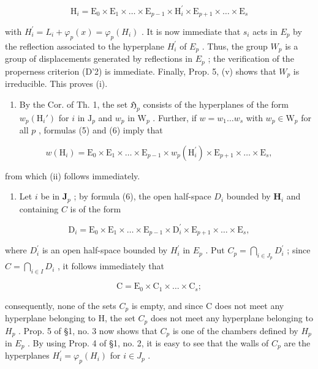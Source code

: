 \[
\mathrm{H} _ {i} = \mathrm{E} _ {0} \times \mathrm{E} _ {1} \times \dots \times \mathrm{E} _ {p - 1} \times \mathrm{H} _ {i} ^ {\prime} \times \mathrm{E} _ {p + 1} \times \dots \times \mathrm{E} _ {s}\tag{6}
\]

with \(H_{i}^{\prime}=L_{i}+\varphi_{p}(x)=\varphi_{p}(H_{i})\) . It is now immediate that \(s_{i}\) acts in \(E_{p}\) by the reflection associated to the hyperplane \(H_{i}^{\prime}\) of \(E_{p}\) . Thus, the group \(W_{p}\) is a group of displacements generated by reflections in \(E_{p}\) ; the verification of the properness criterion (D'2) is immediate. Finally, Prop. 5, (v) shows that \(W_{p}\) is irreducible. This proves (i).

\begin{enumerate}
\def\labelenumi{(\roman{enumi})}
\setcounter{enumi}{1}
\tightlist
\item
  By the Cor. of Th. 1, the set \(\mathfrak{H}_p\) consists of the hyperplanes of the form \(w_p(\mathrm{H}_i')\) for \(i\) in \(\mathrm{J}_p\) and \(w_p\) in \(\mathrm{W}_p\) . Further, if \(w = w_1 \ldots w_s\) with \(w_p \in \mathrm{W}_p\) for all \(p\) , formulas (5) and (6) imply that
\end{enumerate}

\[
w (\mathrm{H} _ {i}) = \mathrm{E} _ {0} \times \mathrm{E} _ {1} \times \dots \times \mathrm{E} _ {p - 1} \times w _ {p} (\mathrm{H} _ {i} ^ {\prime}) \times \mathrm{E} _ {p + 1} \times \dots \times \mathrm{E} _ {s},\tag{7}
\]

from which (ii) follows immediately.

\begin{enumerate}
\def\labelenumi{(\roman{enumi})}
\setcounter{enumi}{2}
\tightlist
\item
  Let \(i\) be in \(\mathbf{J}_p\) ; by formula (6), the open half-space \(D_i\) bounded by \(\mathbf{H}_i\) and containing \(C\) is of the form
\end{enumerate}

\[
\mathrm{D} _ {i} = \mathrm{E} _ {0} \times \mathrm{E} _ {1} \times \dots \times \mathrm{E} _ {p - 1} \times \mathrm{D} _ {i} ^ {\prime} \times \mathrm{E} _ {p + 1} \times \dots \times \mathrm{E} _ {s},
\]

where \(D_{i}^{\prime}\) is an open half-space bounded by \(H_{i}^{\prime}\) in \(E_{p}\) . Put \(C_{p} = \bigcap_{i \in J_{p}} D_{i}^{\prime}\) ; since \(C = \bigcap_{i \in I} D_{i}\) , it follows immediately that

\[
\mathrm{C} = \mathrm{E} _ {0} \times \mathrm{C} _ {1} \times \dots \times \mathrm{C} _ {s};
\]

consequently, none of the sets \(C_{p}\) is empty, and since C does not meet any hyperplane belonging to H, the set \(C_{p}\) does not meet any hyperplane belonging to \(H_{p}\) . Prop. 5 of §1, no. 3 now shows that \(C_{p}\) is one of the chambers defined by \(H_{p}\) in \(E_{p}\) . By using Prop. 4 of §1, no. 2, it is easy to see that the walls of \(C_{p}\) are the hyperplanes \(H_{i}^{\prime} = \varphi_{p}(H_{i})\) for \(i \in J_{p}\) .

